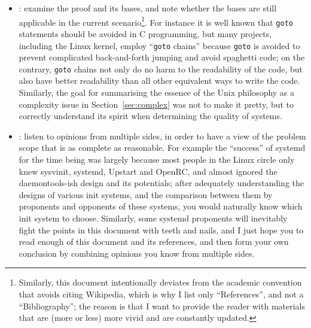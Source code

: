 \begin{itemize}
\item {}: examine the proof and its
	bases, and note whether the bases are still applicable in the current
	scenario\footnote{Similarly, this document intentionally deviates from the
	academic convention that avoids citing Wikipedia, which is why I list only
	``References'', and not a ``Bibliography''; the reason is that I want to
	provide the reader with materials that are (more or less) more vivid and
	are constantly updated.}.  For instance it is well known that \verb|goto|
	statements should be avoided in C programming, but many projects, including
	the Linux kernel, employ ``\verb|goto| chains''
	because \verb|goto| is avoided to prevent complicated back-and-forth jumping
	and avoid spaghetti code; on the contrary, \verb|goto| chains not only
	do no harm to the readability of the code, but also have better readability
	than all other equivalent ways to write the code.  Similarly, the goal for
	summarising the essence of the Unix philosophy as a complexity issue in
	Section~\ref{sec:complex} was not to make it pretty, but to correctly
	understand its spirit when determining the quality of systems.
\item {}: listen to opinions
	from multiple sides, in order to have a view of the problem scope that
	is as complete as reasonable.  For example the ``success'' of systemd
	for the time being was largely because most people in the Linux circle
	only knew sysvinit, systemd, Upstart and OpenRC, and almost ignored the
	daemontools-ish design and its potentials; after adequately understanding
	the designs of various init systems, and the comparison between them by
	proponents and opponents of these systems, you would naturally know which
	init system to choose.  Similarly, some systemd proponents will inevitably
	fight the points in this document with teeth and nails, and I just hope you
	to read enough of this document and its references, and then form your
	own conclusion by combining opinions you know from multiple sides.
\end{itemize}

